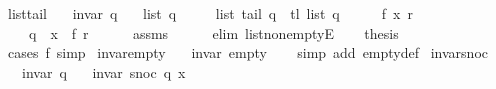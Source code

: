 \begin{isabellebody}
\endisatagproof
{\isafoldproof}%
%
\isadelimproof
\isanewline
%
\endisadelimproof
\isanewline
{}\isamarkupfalse%
\ list{\isacharunderscore}{\kern0pt}tail{\isacharcolon}{\kern0pt}\isanewline
\ \ \ {\isachardoublequoteopen}invar\ q{\isachardoublequoteclose}\isanewline
\ \ \ {\isachardoublequoteopen}list\ q\ {\isasymnoteq}\ {\isacharbrackleft}{\kern0pt}{\isacharbrackright}{\kern0pt}{\isachardoublequoteclose}\isanewline
\ \ \ {\isachardoublequoteopen}list\ {\isacharparenleft}{\kern0pt}tail\ q{\isacharparenright}{\kern0pt}\ {\isacharequal}{\kern0pt}\ tl\ {\isacharparenleft}{\kern0pt}list\ q{\isacharparenright}{\kern0pt}{\isachardoublequoteclose}\isanewline
%
\isadelimproof
%
\endisadelimproof
%
\isatagproof
{}\isamarkupfalse%
\ {\isacharminus}{\kern0pt}\isanewline
\ \ \isamarkupfalse%
\ f\ x\ r\ \isanewline
\ \ \ \ {\isachardoublequoteopen}q\ {\isacharequal}{\kern0pt}\ {\isacharparenleft}{\kern0pt}x\ {\isacharhash}{\kern0pt}\ f{\isacharcomma}{\kern0pt}\ r{\isacharparenright}{\kern0pt}{\isachardoublequoteclose}\isanewline
\ \ \ \ \isamarkupfalse%
\ assms\isanewline
\ \ \ \ \isamarkupfalse%
\ {\isacharparenleft}{\kern0pt}elim\ list{\isacharunderscore}{\kern0pt}non{\isacharunderscore}{\kern0pt}emptyE{\isacharparenright}{\kern0pt}\isanewline
\ \ \isamarkupfalse%
\ {\isacharquery}{\kern0pt}thesis\isanewline
\ \ \ \ \isamarkupfalse%
\ {\isacharparenleft}{\kern0pt}cases\ f{\isacharparenright}{\kern0pt}\ simp{\isacharplus}{\kern0pt}\isanewline
{}\isamarkupfalse%
%
\endisatagproof
{\isafoldproof}%
%
\isadelimproof
\isanewline
%
\endisadelimproof
\isanewline
{}\isamarkupfalse%
\ invar{\isacharunderscore}{\kern0pt}empty{\isacharcolon}{\kern0pt}\isanewline
\ \ \ {\isachardoublequoteopen}invar\ empty{\isachardoublequoteclose}\isanewline
%
\isadelimproof
\ \ %
\endisadelimproof
%
\isatagproof
{}\isamarkupfalse%
\ {\isacharparenleft}{\kern0pt}simp\ add{\isacharcolon}{\kern0pt}\ empty{\isacharunderscore}{\kern0pt}def{\isacharparenright}{\kern0pt}%
\endisatagproof
{\isafoldproof}%
%
\isadelimproof
\isanewline
%
\endisadelimproof
\isanewline
{}\isamarkupfalse%
\ invar{\isacharunderscore}{\kern0pt}snoc{\isacharcolon}{\kern0pt}\isanewline
\ \ \ {\isachardoublequoteopen}invar\ q{\isachardoublequoteclose}\isanewline
\ \ \ {\isachardoublequoteopen}invar\ {\isacharparenleft}{\kern0pt}snoc\ q\ x{\isacharparenright}{\kern0pt}{\isachardoublequoteclose}\isanewline

\end{isabellebody}
